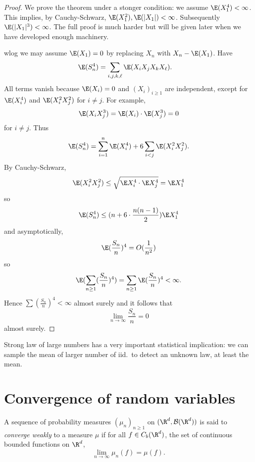 \documentclass[a4paper]{article}
\begin{document}
\begin{proof}
  We prove the theorem under a stonger condition: we assume \(\E(X_1^4) < \infty\). This implies, by Cauchy-Schwarz, \(\E(X_1^2), \E(|X_1|) < \infty\). Subsequently \(\E(|X_1|^3) < \infty\). The full proof is much harder but will be given later when we have developed enough machinery.

  wlog we may assume \(\E(X_1) = 0\) by replacing \(X_n\) with \(X_n - \E(X_1)\). Have
  \begin{align*}
    \E(S_n^4)
    &= \sum_{i,j, k, \ell} \E(X_iX_jX_kX_\ell).
  \end{align*}
  All terms vanish because \(\E(X_i) = 0\) and \((X_i)_{i \geq 1}\) are independent, except for \(\E(X_i^4)\) and \(\E(X_i^2X_j^2)\) for \(i \neq j\). For example,
  \[
    \E(X_iX_j^3) = \E(X_i) \cdot \E(X_j^3) = 0
  \]
  for \(i \neq j\). Thus
  \[
    \E(S_n^4) = \sum_{i = 1}^n \E (X_i^4) + 6 \sum_{i < j} \E(X_i^2 X_j^2).
  \]
  By Cauchy-Schwarz,
  \[
    \E(X_i^2X_j^2) \leq \sqrt{\E X_i^4 \cdot \E X_j^4} = \E X_1^4
  \]
  so
  \[
    \E(S_n^4) \leq (n + 6 \cdot \frac{n(n - 1)}{2}) \E X_1^4
  \]
  and asymptotically,
  \[
    \E (\frac{S_n}{n})^4 = O(\frac{1}{n^2})
  \]
  so
  \[
    \E (\sum_{n \geq 1} (\frac{S_n}{n})^4) = \sum_{n \geq 1} \E(\frac{S_n}{n})^4 < \infty.
  \]
  Hence \(\sum (\frac{S_n}{n})^4 < \infty\) almost surely and it follows that
  \[
    \lim_{n \to \infty} \frac{S_n}{n} = 0
  \]
  almost surely.
\end{proof}

Strong law of large numbers has a very important statistical implication: we can sample the mean of larger number of iid.\ to detect an unknown law, at least the mean.

\section{Convergence of random variables}

\begin{definition}
  A sequence of probability measures \((\mu_n)_{n \geq 1}\) on \((\R^d, \mathcal B(\R^d))\) is said to \emph{converge weakly} to a measure \(\mu\) if for all \(f \in C_b(\R^d)\), the set of continuous bounded functions on \(\R^d\),
  \[
    \lim_{n \to \infty} \mu_n(f) = \mu(f).
  \]
\end{definition}
\end{document}
